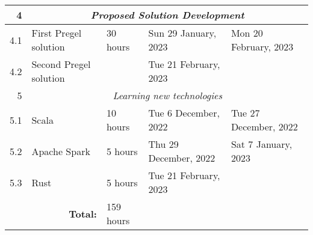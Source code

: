\documentclass{standalone}
\begin{document}
\begin{tabular}{|r|llll|}
    4                                                             & \multicolumn{4}{c|}{\textit{Proposed Solution Development}}                                                                                                                                                                                                   \\ \hline
    4.1                                                           & \multicolumn{1}{l|}{First Pregel solution}                      & \multicolumn{1}{l|}{30 hours}                                  & \multicolumn{1}{l|}{Sun 29 January, 2023}                   & Mon 20 February, 2023                                        \\ \hline
    4.2                                                           & \multicolumn{1}{l|}{Second Pregel solution}                     & \multicolumn{1}{l|}{}                                          & \multicolumn{1}{l|}{Tue 21 February, 2023}                  &                                                              \\ \hline
    5                                                             & \multicolumn{4}{c|}{\textit{Learning new technologies}}                                                                                                                                                                                                       \\ \hline
    5.1                                                           & \multicolumn{1}{l|}{Scala}                                      & \multicolumn{1}{l|}{10 hours}                                  & \multicolumn{1}{l|}{Tue 6 December, 2022}                   & Tue 27 December, 2022                                        \\ \hline
    5.2                                                           & \multicolumn{1}{l|}{Apache Spark}                               & \multicolumn{1}{l|}{5 hours}                                   & \multicolumn{1}{l|}{Thu 29 December, 2022}                  & Sat 7 January, 2023                                          \\ \hline
    5.3                                                           & \multicolumn{1}{l|}{Rust}                                       & \multicolumn{1}{l|}{5 hours}                                   & \multicolumn{1}{l|}{Tue 21 February, 2023}                  &                                                              \\ \hline
    \multicolumn{2}{|r|}{\cellcolor[HTML]{C0C0C0}\textbf{Total:}} & \multicolumn{1}{l|}{159 hours}                                                                                                                                                                                                                                \\ \cline{1-3}
\end{tabular}
\end{document}
